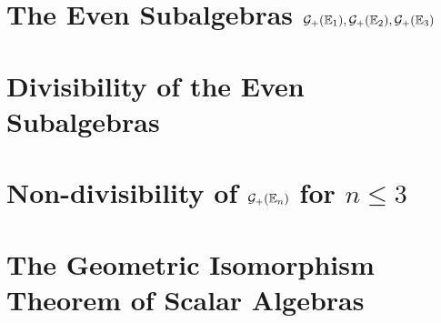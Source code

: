 \section{The Even Subalgebras $\mathcal{G}_+(\mathbb{E}_1),\mathcal{G}_+(\mathbb{E}_2),\mathcal{G}_+(\mathbb{E}_3)$}

\section{Divisibility of the Even Subalgebras}

\section{Non-divisibility of $\mathcal{G}_+(\mathbb{E}_n)$ for $n \leq 3$}

\section{The Geometric Isomorphism Theorem of Scalar Algebras}

